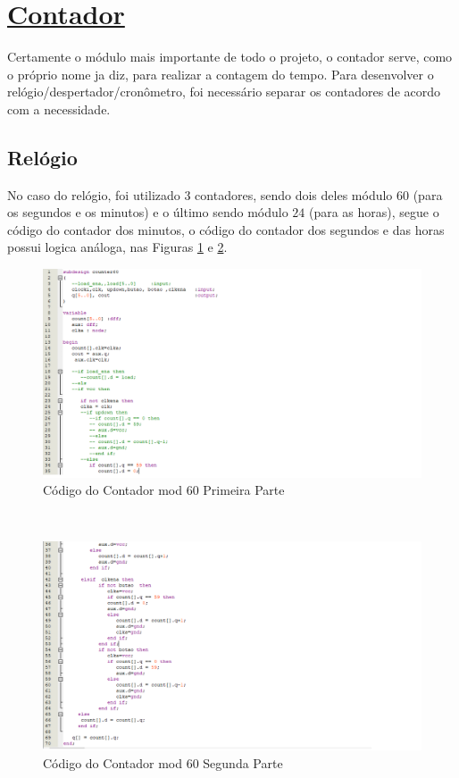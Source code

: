 \documentclass[14pt, oneside]{book}
\newcommand\tab[1][1cm]{\hspace*{#1}}
\theoremstyle{definition}
\begin{document}
            \section[Contador]{\hyperlink{toc}{Contador}}
                \tab Certamente o módulo mais importante de todo o projeto, o contador serve, como o próprio nome ja diz, para realizar a contagem do tempo. Para desenvolver o relógio/despertador/cronômetro, foi necessário separar os contadores de acordo com a necessidade.
                \subsection{Relógio}
                \tab No caso do relógio, foi utilizado $3$ contadores, sendo dois deles módulo $60$ (para os segundos e os minutos) e o último sendo módulo $24$ (para as horas), segue o código do contador dos minutos, o código do contador dos segundos e das horas possui logica análoga, nas Figuras \ref{fig:c1} e \ref{fig:c2}. \\
                \begin{figure}[H]
                    \centering
                    \includegraphics[scale=0.7]{cont60p1.png}
                    \caption{Código do Contador mod 60 Primeira Parte}
                    \label{fig:c1}
                \end{figure} \\
                
                \begin{figure}[H]
                    \centering
                    \includegraphics[scale=0.6]{cont60p2.png}
                    \caption{Código do Contador mod 60 Segunda Parte}
                    \label{fig:c2}
                \end{figure}\\
                
\end{document}
